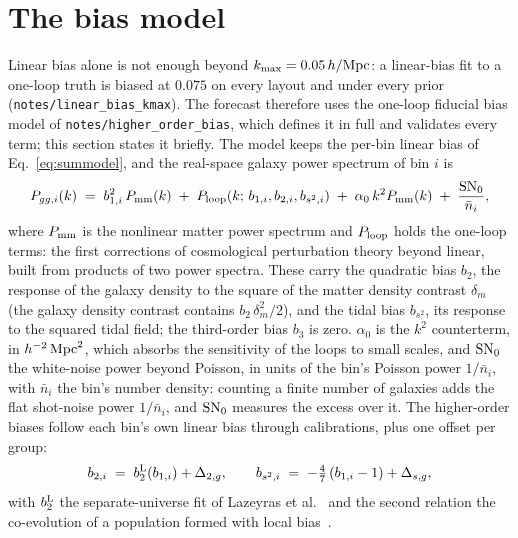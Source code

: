 \documentclass[11pt]{article}
\newcommand{\kmax}{k_{\rm max}}
\newcommand{\hMpc}{\,h/{\rm Mpc}}
\newcommand{\bstwo}{b_{s^2}}
\newcommand{\SNz}{{\rm SN}_0}
\begin{document}
\section{The bias model}
\label{sec:biasmodel}

Linear bias alone is not enough beyond $\kmax = 0.05\hMpc$: a
linear-bias fit to a one-loop truth is biased at $0.075$ on every
layout and under every prior (\texttt{notes/linear\_bias\_kmax}).  The
forecast therefore uses the one-loop fiducial bias model of
\texttt{notes/higher\_order\_bias}, which defines it in full and
validates every term; this section states it briefly.  The model keeps
the per-bin linear bias of Eq.~\eqref{eq:summodel}, and the real-space
galaxy power spectrum of bin $i$ is
\begin{equation}
  P_{gg,i}(k) \;=\; b_{1,i}^2\,P_{\rm mm}(k)
  \;+\; P_{\rm loop}(k;\, b_{1,i}, b_{2,i}, b_{s^2,i})
  \;+\; \alpha_{0}\,k^2 P_{\rm mm}(k)
  \;+\; \frac{\SNz}{\bar{n}_i} ,
  \label{eq:oneloop}
\end{equation}
where $P_{\rm mm}$ is the nonlinear matter power spectrum and
$P_{\rm loop}$ holds the one-loop terms: the first corrections of
cosmological perturbation theory beyond linear, built from products of
two power spectra.  These carry the quadratic
bias $b_2$, the response of the galaxy density to the square of the
matter density contrast $\delta_m$ (the galaxy density contrast
contains $b_2\,\delta_m^2/2$), and the tidal bias $\bstwo$, its
response to the squared tidal field; the third-order bias $b_3$ is
zero.  $\alpha_0$ is the $k^2$ counterterm, in $h^{-2}\,{\rm Mpc}^2$,
which absorbs the sensitivity of the loops to small scales, and $\SNz$
the white-noise power beyond Poisson, in units of the bin's Poisson
power $1/\bar{n}_i$, with $\bar{n}_i$ the bin's number density:
counting a finite number of galaxies adds the flat shot-noise power
$1/\bar{n}_i$, and $\SNz$ measures the excess over it.  The
higher-order biases follow each bin's own linear bias through
calibrations, plus one offset per group:
\begin{equation}
  b_{2,i} \;=\; b_2^{\rm L}(b_{1,i}) + \Delta_{2,g},
  \qquad
  b_{s^2,i} \;=\; -\tfrac{4}{7}\,(b_{1,i} - 1) + \Delta_{s,g},
  \label{eq:calibrations}
\end{equation}
with $b_2^{\rm L}$ the separate-universe fit of Lazeyras et
al.~\cite{Lazeyras2016} and the second relation the co-evolution of a
population formed with local bias~\cite{Saito2014}.
\end{document}
